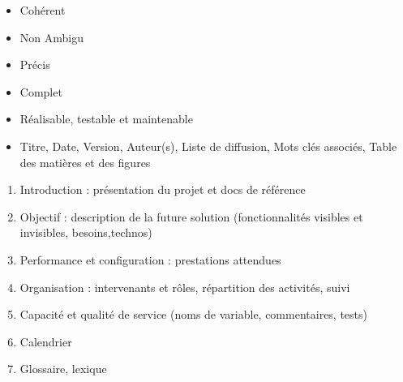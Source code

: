 \begin{itemize}
	\item Cohérent
	\item Non Ambigu
	\item Précis
	\item Complet
	\item Réalisable, testable et maintenable
	\item Titre, Date, Version, Auteur(s), Liste de diffusion, Mots clés associés, Table des matières et des figures
\end{itemize}

\begin{enumerate}
	\item Introduction : présentation du projet et docs de référence
	\item Objectif : description de la future solution (fonctionnalités visibles et invisibles, besoins,technos)
	\item Performance et configuration : prestations attendues
	\item Organisation : intervenants et rôles, répartition des activités, suivi
	\item Capacité et qualité de service (noms de variable, commentaires, tests)
	\item Calendrier
	\item Glossaire, lexique
\end{enumerate}
